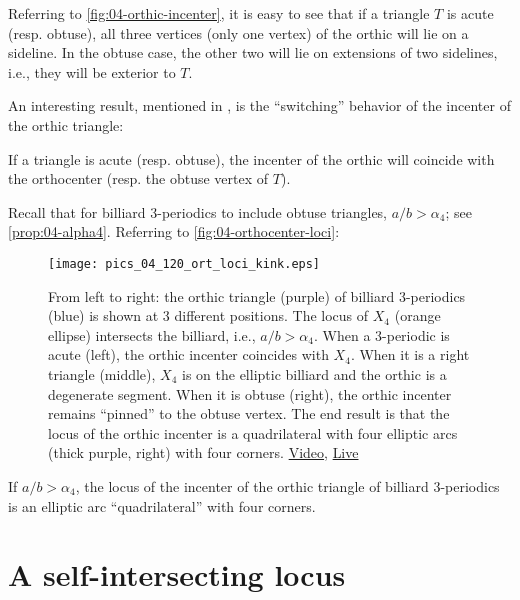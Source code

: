 Referring to \cref{fig:04-orthic-incenter}, 
it is easy to see that if a triangle $T$ is acute (resp. obtuse), all three vertices (only one vertex) of the orthic will lie on a sideline. In the obtuse case, the other two will lie on extensions of two sidelines, i.e., they will be exterior to $T$.

An interesting result, mentioned in \cite[Chapter 1]{coxeter67}, is the ``switching'' behavior of the incenter of the orthic triangle:

\begin{lemma}
If a triangle is acute (resp. obtuse), the incenter of the orthic will coincide with the orthocenter (resp. the obtuse vertex of $T$).
\label{lem:04-pinned}
\end{lemma}

Recall that for billiard 3-periodics to include obtuse triangles, $a/b>\alpha_4$; see \cref{prop:04-alpha4}. Referring to
\cref{fig:04-orthocenter-loci}:

\begin{figure}
    \centering
    \texttt{[image: pics\_04\_120\_ort\_loci\_kink.eps]}
    \caption{From left to right: the orthic triangle (purple) of billiard 3-periodics (blue) is shown at 3 different positions. The locus of $X_4$ (orange ellipse) intersects the billiard, i.e., $a/b>\alpha_4$. When a 3-periodic is acute (left), the orthic incenter coincides with $X_4$. When it is a right triangle (middle), $X_4$ is on the elliptic billiard and the orthic is a degenerate segment. When it is obtuse (right), the orthic incenter remains ``pinned'' to the obtuse vertex. The end result is that the locus of the orthic incenter is a quadrilateral with four elliptic arcs (thick purple, right) with four corners.  \href{https://youtu.be/3qJnwpFkUFQ}{Video}, \href{https://bit.ly/33TVjit}{Live}}
    \label{fig:04-orthic_incenter_locus}
\end{figure}

\begin{corollary}
If $a/b>\alpha_4$, the locus of the incenter of the orthic triangle of billiard 3-periodics is an elliptic arc ``quadrilateral'' with four corners.
\end{corollary}


\section{A self-intersecting locus}

